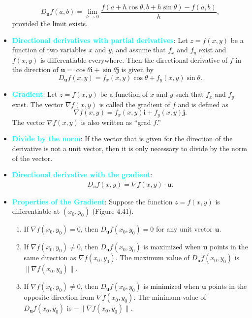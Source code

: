 \documentclass{report}
\begin{document}
\begin{itemize}
        \begin{equation}
            D_{\mathbf{u}}f(a,b) = \lim_{h \to 0} \frac{f(a+h\cos\theta, b+h\sin\theta) - f(a,b)}{h},
        \end{equation}
        provided the limit exists.
    \item \textbf{\textcolor{cyan}{Directional derivatives with partial derivatives}}:
        Let $z=f(x,y)$ be a function of two variables $x$ and $y$, and assume that $f_x$ and $f_y$ exist and $f(x, y)$ is differentiable everywhere. Then the directional derivative of $f$ in the direction of $\mathbf{u}=\cos\theta \mathbf{i} + \sin\theta \mathbf{j}$ is given by
        \[
            D_{\mathbf{u}}f(x,y) = f_x(x,y)\cos\theta + f_y(x,y)\sin\theta.
        \]
    \item \textbf{\textcolor{cyan}{Gradient}}:
        Let $z=f(x,y)$ be a function of $x$ and $y$ such that $f_x$ and $f_y$ exist. The vector $\nabla f(x,y)$ is called the gradient of $f$ and is defined as
        \begin{equation}
        \nabla f(x,y) = f_x(x,y)\mathbf{i} + f_y(x,y)\mathbf{j}.
        \end{equation}
        The vector $\nabla f(x,y)$ is also written as “grad $f$.”
    \item \textbf{\textcolor{cyan}{Divide by the norm}}: If the vector that is given for the direction of the derivative is not a unit vector, then it is only necessary to divide by the norm of the vector.
    \item \textbf{\textcolor{cyan}{Directional derivative with the gradient}}:
        \begin{align*}
            D_{u}f(x,y) = \nabla f(x,y) \cdot \mathbf{u}
        .\end{align*}
    \item \textbf{\textcolor{cyan}{Properties of the Gradient}}:
        Suppose the function $z=f(x,y)$ is differentiable at $(x_0,y_0)$ (Figure 4.41).
        \begin{enumerate}
            \item If $\nabla f(x_0,y_0) = 0$, then $D_{\mathbf{u}}f(x_0,y_0) = 0$ for any unit vector $\mathbf{u}$.
            \item If $\nabla f(x_0,y_0) \neq 0$, then $D_{\mathbf{u}}f(x_0,y_0)$ is maximized when $\mathbf{u}$ points in the same direction as $\nabla f(x_0,y_0)$. The maximum value of $D_{\mathbf{u}}f(x_0,y_0)$ is $\|\nabla f(x_0,y_0)\|$.
            \item If $\nabla f(x_0,y_0) \neq 0$, then $D_{\mathbf{u}}f(x_0,y_0)$ is minimized when $\mathbf{u}$ points in the opposite direction from $\nabla f(x_0,y_0)$. The minimum value of $D_{\mathbf{u}}f(x_0,y_0)$ is $-\|\nabla f(x_0,y_0)\|$.

\end{enumerate}
\end{itemize}
\end{document}
